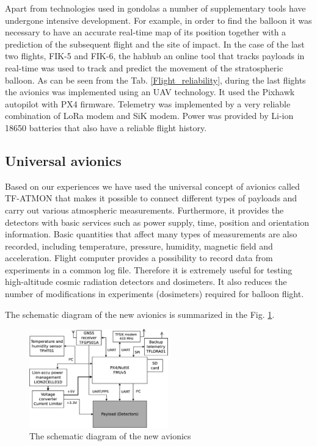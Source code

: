 \documentclass{Rpd}
\begin{document}
Apart from technologies used in gondolas a number of supplementary tools have undergone intensive development. For example, in order to find the balloon it was necessary to have an accurate real-time map of its position together with a prediction of the subsequent flight and the site of impact. In the case of the last two flights, FIK-5 and FIK-6, the habhub an online tool that tracks payloads in real-time \cite{habhub_tracker} was used to track and predict the movement of the stratospheric balloon.
As can be seen from the Tab. \ref{Flight_reliability}, during the last flights the avionics was implemented using an UAV technology. It used the Pixhawk autopilot with PX4 firmware. Telemetry was implemented by a very reliable combination of LoRa modem and SiK modem. Power was provided by Li-ion 18650 batteries that also have a reliable flight history.



\subsection{Universal avionics}
Based on our experiences we have used the universal concept of avionics called TF-ATMON that makes it possible to connect different types of payloads and carry out various atmospheric measurements. Furthermore, it provides the detectors with basic services such as power supply, time, position and orientation information. Basic quantities that affect many types of measurements are also recorded, including temperature, pressure, humidity, magnetic field and acceleration. Flight computer provides a possibility to record data from experiments in a common log file. Therefore it is extremely useful for testing high-altitude cosmic radiation detectors and dosimeters. It also reduces the number of modifications in experiments (dosimeters) required for balloon flight.

The schematic diagram of the new avionics is summarized in the Fig. \ref{avionics_schematics}.


\begin{figure}%
	\centerline{\includegraphics[width=60mm]{img/avionics_block_schematics.eps}}
	\caption{The schematic diagram of the new avionics \label{avionics_schematics}}
\end{figure}
\end{document}
